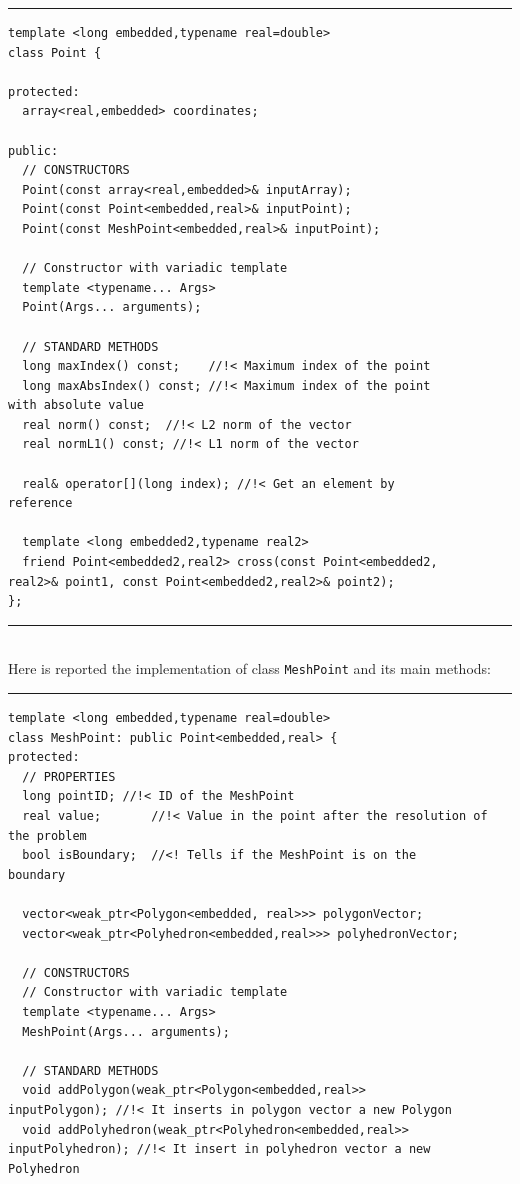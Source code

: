 \noindent\rule{12.7cm}{1pt}
\begin{verbatim}
template <long embedded,typename real=double>
class Point {

protected:
  array<real,embedded> coordinates;

public:
  // CONSTRUCTORS
  Point(const array<real,embedded>& inputArray);
  Point(const Point<embedded,real>& inputPoint);
  Point(const MeshPoint<embedded,real>& inputPoint);

  // Constructor with variadic template
  template <typename... Args>
  Point(Args... arguments);

  // STANDARD METHODS
  long maxIndex() const;	//!< Maximum index of the point
  long maxAbsIndex() const;	//!< Maximum index of the point 
with absolute value
  real norm() const;  //!< L2 norm of the vector
  real normL1() const; //!< L1 norm of the vector

  real& operator[](long index);	//!< Get an element by 
reference

  template <long embedded2,typename real2>
  friend Point<embedded2,real2> cross(const Point<embedded2,
real2>& point1, const Point<embedded2,real2>& point2);
};
\end{verbatim}

\noindent\rule{12.7cm}{1pt}\\

Here is reported the implementation of class \verb|MeshPoint| and its main methods:\\

\noindent\rule{12.7cm}{1pt}
\begin{verbatim}
template <long embedded,typename real=double>
class MeshPoint: public Point<embedded,real> {
protected:
  // PROPERTIES
  long pointID;	//!< ID of the MeshPoint
  real value;		//!< Value in the point after the resolution of 
the problem
  bool isBoundary;	//<! Tells if the MeshPoint is on the 
boundary

  vector<weak_ptr<Polygon<embedded, real>>> polygonVector;
  vector<weak_ptr<Polyhedron<embedded,real>>> polyhedronVector;

  // CONSTRUCTORS
  // Constructor with variadic template
  template <typename... Args>
  MeshPoint(Args... arguments);

  // STANDARD METHODS
  void addPolygon(weak_ptr<Polygon<embedded,real>> 
inputPolygon); //!< It inserts in polygon vector a new Polygon
  void addPolyhedron(weak_ptr<Polyhedron<embedded,real>> 
inputPolyhedron); //!< It insert in polyhedron vector a new 
Polyhedron
\end{verbatim}

